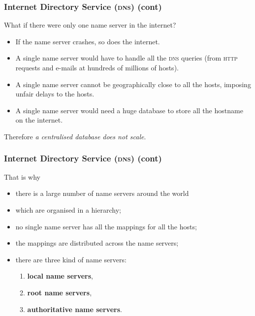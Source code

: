 %
\begin{frame}
\frametitle{Internet Directory Service (\textsc{dns}) (cont)}

What if there were only one name server in the internet?

\begin{itemize}

  \item If the name server crashes, so does the internet.

  \item A single name server would have to handle all the
  \textsc{dns} queries (from \textsc{http} requests and e-mails at
  hundreds of millions of hosts).

  \item A single name server cannot be geographically close to all
  the hosts, imposing unfair delays to the hosts.

  \item A single name server would need a huge database to store all
  the hostname on the internet.

\end{itemize}

Therefore \emph{a centralised database does not scale}.

\end{frame}

%
\begin{frame}
\frametitle{Internet Directory Service (\textsc{dns}) (cont)}

That is why

\begin{itemize}

  \item there is a large number of name servers around the world

  \item which are organised in a hierarchy;

  \item no single name server has all the mappings for all the hosts;

  \item the mappings are distributed across the name servers;

  \item there are three kind of name servers:
  \begin{enumerate}

    \item \textbf{local name servers},

    \item \textbf{root name servers},

    \item \textbf{authoritative name servers}.

  \end{enumerate}

\end{itemize}

\end{frame}

